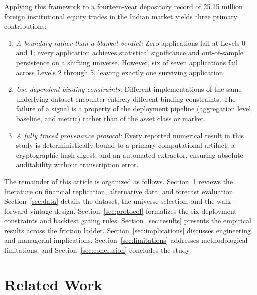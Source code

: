 \documentclass{ieeeaccess}
\begin{document}
Applying this framework to a fourteen-year depository record of 25.15 million foreign institutional equity trades in the Indian market yields three primary contributions:
\begin{enumerate}
    \item \textit{A boundary rather than a blanket verdict:} Zero applications fail at Levels 0 and 1; every application achieves statistical significance and out-of-sample persistence on a shifting universe. However, six of seven applications fail across Levels 2 through 5, leaving exactly one surviving application.
    \item \textit{Use-dependent binding constraints:} Different implementations of the same underlying dataset encounter entirely different binding constraints. The failure of a signal is a property of the deployment pipeline (aggregation level, baseline, and metric) rather than of the asset class or market.
    \item \textit{A fully traced provenance protocol:} Every reported numerical result in this study is deterministically bound to a primary computational artifact, a cryptographic hash digest, and an automated extractor, ensuring absolute auditability without transcription error.
\end{enumerate}

The remainder of this article is organized as follows. Section~\ref{sec:related_work} reviews the literature on financial replication, alternative data, and forecast evaluation. Section~\ref{sec:data} details the dataset, the universe selection, and the walk-forward vintage design. Section~\ref{sec:protocol} formalizes the six deployment constraints and backtest gating rules. Section~\ref{sec:results} presents the empirical results across the friction ladder. Section~\ref{sec:implications} discusses engineering and managerial implications. Section~\ref{sec:limitations} addresses methodological limitations, and Section~\ref{sec:conclusion} concludes the study.

\section{Related Work}
\label{sec:related_work}
\end{document}
